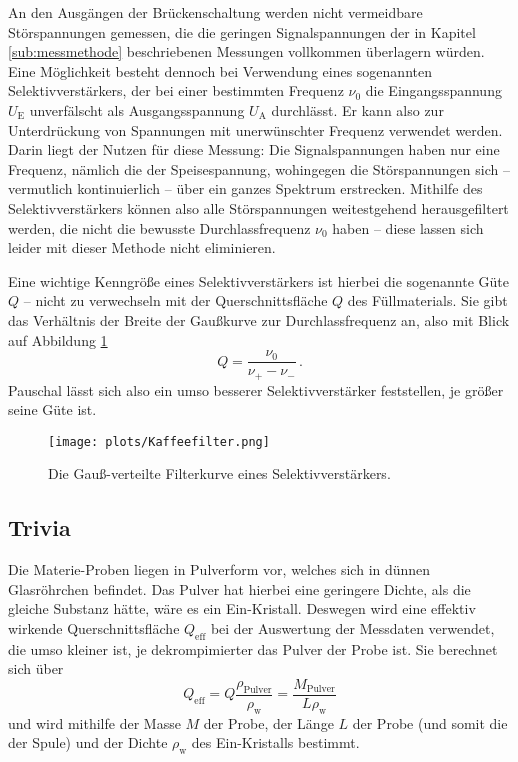     An den Ausgängen der Brückenschaltung werden nicht vermeidbare Störspannungen gemessen, die die geringen Signalspannungen 
    der in Kapitel \ref{sub:messmethode} beschriebenen Messungen vollkommen überlagern würden. 
    Eine Möglichkeit besteht dennoch bei Verwendung eines sogenannten Selektivverstärkers, der bei einer bestimmten Frequenz $\nu _0$
    die Eingangsspannung $U_\text{E}$ unverfälscht als Ausgangsspannung $U_\text{A}$ durchlässt. 
    Er kann also zur Unterdrückung von Spannungen mit unerwünschter Frequenz verwendet werden. 
    Darin liegt der Nutzen für diese Messung: 
    Die Signalspannungen haben nur eine Frequenz, nämlich die der Speisespannung, wohingegen die Störspannungen sich -- 
    vermutlich kontinuierlich -- über ein ganzes Spektrum erstrecken. 
    Mithilfe des Selektivverstärkers können also alle Störspannungen weitestgehend herausgefiltert werden, die nicht die 
    bewusste Durchlassfrequenz $\nu _0$ haben -- diese lassen sich leider mit dieser Methode nicht eliminieren. 

    Eine wichtige Kenngröße eines Selektivverstärkers ist hierbei die sogenannte Güte $Q$ -- nicht zu verwechseln mit der 
    Querschnittsfläche $Q$ des Füllmaterials. 
    Sie gibt das Verhältnis der Breite der Gaußkurve zur Durchlassfrequenz an, also mit Blick auf Abbildung \ref{fig:Kaffeefilter}
    \begin{equation*}
        Q=\frac{\nu _0}{\nu_+ -\nu_-}\,.
    \end{equation*}
    Pauschal lässt sich also ein umso besserer Selektivverstärker feststellen, je größer seine Güte ist. 
    \begin{figure}
        \centering
        \texttt{[image: plots/Kaffeefilter.png]}
        \caption{Die Gauß-verteilte Filterkurve eines Selektivverstärkers\cite{Versuchsanleitung}.}
        \label{fig:Kaffeefilter}
    \end{figure}

\subsection{Trivia}

    Die Materie-Proben liegen in Pulverform vor, welches sich in dünnen Glasröhrchen befindet. 
    Das Pulver hat hierbei eine geringere Dichte, als die gleiche Substanz hätte, wäre es ein Ein-Kristall.
    Deswegen wird eine effektiv wirkende Querschnittsfläche $Q_\text{eff}$ bei der Auswertung der Messdaten verwendet, 
    die umso kleiner ist, je dekrompimierter das Pulver der Probe ist. 
    Sie berechnet sich über 
    \begin{equation}
        Q_\text{eff}=Q\frac{\rho_\text{Pulver}}{\rho_\text{w}}=\frac{M_\text{Pulver}}{L \rho_\text{w}}
        \label{eqn:effQ}
    \end{equation}
    und wird mithilfe der Masse $M$ der Probe, der Länge $L$ der Probe (und somit die der Spule) und der 
    Dichte $\rho_\text{w}$ des Ein-Kristalls bestimmt. 